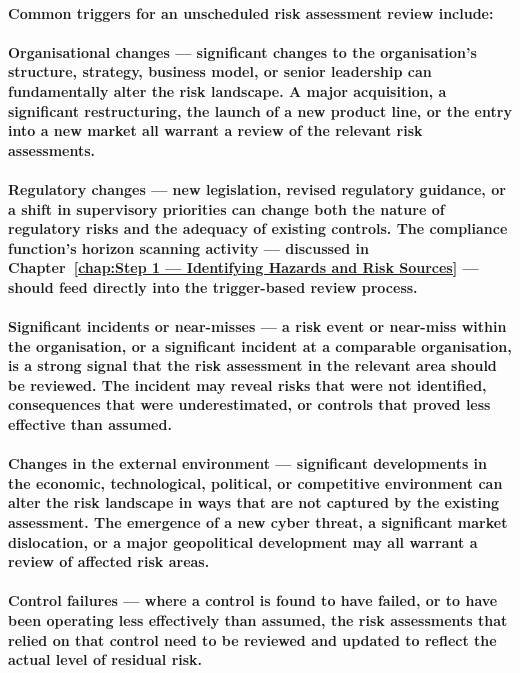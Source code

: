 \paragraph{Common triggers for an unscheduled risk assessment review include:}
\paragraph{\textbf{Organisational changes} — significant changes to the organisation's structure, strategy, business model, or senior leadership can fundamentally alter the risk landscape. A major acquisition, a significant restructuring, the launch of a new product line, or the entry into a new market all warrant a review of the relevant risk assessments.}
\paragraph{\textbf{Regulatory changes} — new legislation, revised regulatory guidance, or a shift in supervisory priorities can change both the nature of regulatory risks and the adequacy of existing controls. The compliance function's horizon scanning activity — discussed in Chapter~\ref{chap:Step 1 — Identifying Hazards and Risk Sources} — should feed directly into the trigger-based review process.}
\paragraph{\textbf{Significant incidents or near-misses} — a risk event or near-miss within the organisation, or a significant incident at a comparable organisation, is a strong signal that the risk assessment in the relevant area should be reviewed. The incident may reveal risks that were not identified, consequences that were underestimated, or controls that proved less effective than assumed.}
\paragraph{\textbf{Changes in the external environment} — significant developments in the economic, technological, political, or competitive environment can alter the risk landscape in ways that are not captured by the existing assessment. The emergence of a new cyber threat, a significant market dislocation, or a major geopolitical development may all warrant a review of affected risk areas.}
\paragraph{\textbf{Control failures} — where a control is found to have failed, or to have been operating less effectively than assumed, the risk assessments that relied on that control need to be reviewed and updated to reflect the actual level of residual risk.}
